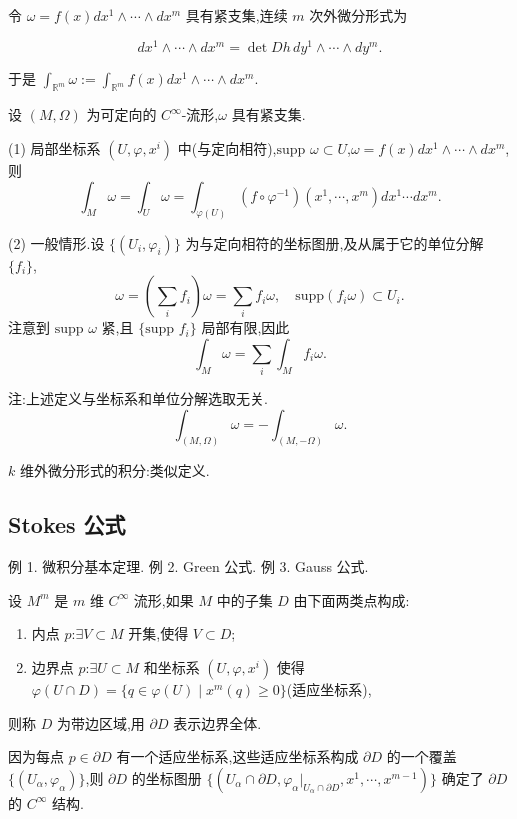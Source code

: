 令 $\omega = f(x)dx^1 \wedge \cdots \wedge dx^m$ 具有紧支集,连续 $m$ 次外微分形式为

\[
dx^1 \wedge \cdots \wedge dx^m = \det Dh \, dy^1 \wedge \cdots \wedge dy^m.
\]

于是 $\int_{\mathbb{R}^m} \omega := \int_{\mathbb{R}^m} f(x)dx^1 \wedge \cdots \wedge dx^m$.

设 $(M, \Omega)$ 为可定向的 $C^{\infty}$-流形,$\omega$ 具有紧支集.

(1) 局部坐标系 $(U, \varphi, x^i)$ 中(与定向相符),$\text{supp }\omega \subset U$,$\omega = f(x)dx^1 \wedge \cdots \wedge dx^m$,则
\[
\int_M \omega = \int_U \omega = \int_{\varphi(U)} (f \circ \varphi^{-1})(x^1, \cdots, x^m)dx^1 \cdots dx^m.
\]

(2) 一般情形.设 $\{(U_i, \varphi_i)\}$ 为与定向相符的坐标图册,及从属于它的单位分解 $\{f_i\}$,
\[
\omega = (\sum_i f_i)\omega = \sum_i f_i\omega, \quad \text{supp}(f_i\omega) \subset U_i.
\]
注意到 $\text{supp }\omega$ 紧,且 $\{\text{supp } f_i\}$ 局部有限,因此
\[
\int_M \omega = \sum_i \int_M f_i\omega.
\]

注:上述定义与坐标系和单位分解选取无关.
\[
\int_{(M, \Omega)} \omega = - \int_{(M, -\Omega)} \omega.
\]

$k$ 维外微分形式的积分:类似定义.

\subsection{Stokes 公式}

例 1. 微积分基本定理.
例 2. Green 公式.
例 3. Gauss 公式.

\begin{definition}
设 $M^m$ 是 $m$ 维 $C^\infty$ 流形,如果 $M$ 中的子集 $D$ 由下面两类点构成:
\begin{enumerate}
    \item 内点 $p$:$\exists V \subset M$ 开集,使得 $V \subset D$;
    \item 边界点 $p$:$\exists U \subset M$ 和坐标系 $(U, \varphi, x^i)$ 使得 $\varphi(U \cap D) = \{q \in \varphi(U) \mid x^m(q) \geq 0\}$(适应坐标系),
\end{enumerate}
则称 $D$ 为带边区域,用 $\partial D$ 表示边界全体.
\end{definition}

因为每点 $p \in \partial D$ 有一个适应坐标系,这些适应坐标系构成 $\partial D$ 的一个覆盖 $\{(U_\alpha, \varphi_\alpha)\}$,则 $\partial D$ 的坐标图册 $\{(U_\alpha \cap \partial D, \varphi_\alpha |_{U_\alpha \cap \partial D}, x^1, \cdots, x^{m-1})\}$ 确定了 $\partial D$ 的 $C^\infty$ 结构.

